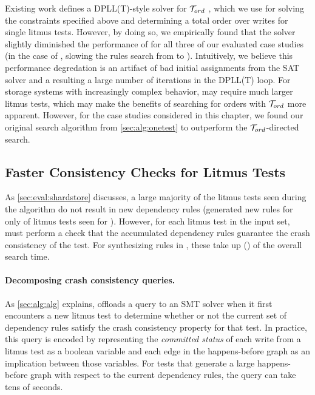 Existing work defines a DPLL(T)-style solver for $\mathcal{T}_{ord}$ \cite{n:tord},
which we use for solving the constraints specified above and
determining a total order over writes for single litmus tests.
However, by doing so, we empirically found that the solver
slightly diminished the performance of \depsynth for all three of our evaluated case studies
(in the case of \shardstore, slowing the rules search from
\shardstoresynthesistime to \shardstoresynthesistimetord).
Intuitively, we believe this performance degredation is an artifact of 
bad initial assignments from the SAT solver
and a resulting a large number of iterations in the DPLL(T) loop.
For storage systems with increasingly complex behavior,
\depsynth may require much larger litmus tests,
which may make the benefits of searching for orders with $\mathcal{T}_{ord}$ more apparent.
However, for the case studies considered in this chapter,
we found our original search algorithm from \cref{sec:alg:onetest}
to outperform the $\mathcal{T}_{ord}$-directed search.

\subsection{Faster Consistency Checks for Litmus Tests}
\label{s:improved-search}
As \cref{sec:eval:shardstore} discusses,
a large majority of the litmus tests seen during the \depsynth
algorithm do not result in new dependency rules
(\depsynth generated new rules for only \shardstoretestsused of \shardstoreinputtests
 litmus tests seen for \shardstore).
However, for each litmus test in the input set, \depsynth
must perform a check that the accumulated dependency rules
guarantee the crash consistency of the test.
For synthesizing rules in \shardstore,
these take up \shardstoreverificationminutes (\shardstoreverificationpercent)
of the overall search time.

\paragraph{Decomposing crash consistency queries.}
As \cref{sec:alg:alg} explains, \depsynth offloads a query to an SMT
solver when it first encounters a new litmus test to determine
whether or not the current set of dependency rules satisfy the
crash consistency property for that test.
In practice, this query is encoded by representing the \textit{committed status}
of each write from a litmus test as a boolean variable
and each edge in the happens-before graph as an implication between those variables.
For tests that generate a large happens-before graph
with respect to the current dependency rules,
the query can take tens of seconds.

